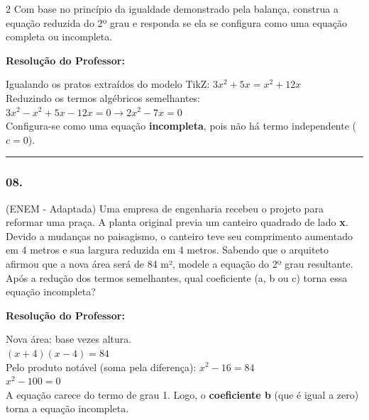 \begin{multicols*}{2}
Com base no princípio da igualdade demonstrado pela balança, construa a equação reduzida do 2º grau e responda se ela se configura como uma equação completa ou incompleta.

\ifgabarito
    \begin{tcolorbox}[colback=CorTitUm!5, colframe=CorTitUm, boxrule=1pt, arc=4pt, left=6pt, right=6pt, top=6pt, bottom=6pt]
    \small\textbf{\textcolor{CorTitUm}{Resolução do Professor:}}\par\vspace{0.1cm}
    \color{CinzaEscuro}
    Igualando os pratos extraídos do modelo TikZ: $3x^2 + 5x = x^2 + 12x$\\
    Reduzindo os termos algébricos semelhantes:\\
    $3x^2 - x^2 + 5x - 12x = 0 \rightarrow 2x^2 - 7x = 0$\\
    Configura-se como uma equação \textbf{incompleta}, pois não há termo independente ($c=0$).
    \end{tcolorbox}
\fi

\par\vspace{\espacoQuestao}

\noindent\textcolor{CorLinha}{\rule{\linewidth}{0.5pt}} 
\par\vspace{\espacoPreQuestao}
\subsubsection*{08.} (ENEM - Adaptada) Uma empresa de engenharia recebeu o projeto para reformar uma praça. A planta original previa um canteiro quadrado de lado \textbf{x}. Devido a mudanças no paisagismo, o canteiro teve seu comprimento aumentado em 4 metros e sua largura reduzida em 4 metros. Sabendo que o arquiteto afirmou que a nova área será de 84 m², modele a equação do 2º grau resultante. Após a redução dos termos semelhantes, qual coeficiente (a, b ou c) torna essa equação incompleta?

\ifgabarito
    \begin{tcolorbox}[colback=CorTitUm!5, colframe=CorTitUm, boxrule=1pt, arc=4pt, left=6pt, right=6pt, top=6pt, bottom=6pt]
    \small\textbf{\textcolor{CorTitUm}{Resolução do Professor:}}\par\vspace{0.1cm}
    \color{CinzaEscuro}
    Nova área: base vezes altura.\\
    $(x + 4)(x - 4) = 84$\\
    Pelo produto notável (soma pela diferença): $x^2 - 16 = 84$\\
    $x^2 - 100 = 0$\\
    A equação carece do termo de grau 1. Logo, o \textbf{coeficiente b} (que é igual a zero) torna a equação incompleta.
    \end{tcolorbox}
\fi


\end{multicols*}
